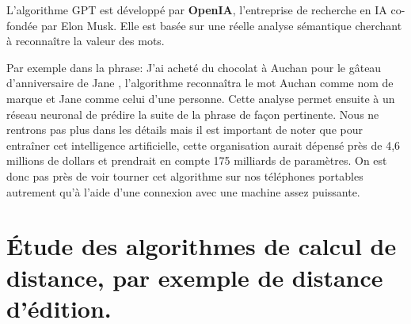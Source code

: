 \documentclass[final, 10pt]{report}
\begin{document}
        L'algorithme GPT est développé par \textbf{OpenIA}, l’entreprise de recherche en IA co-fondée par Elon Musk\cite{noauthor_quest_2021}.
        Elle est basée sur une réelle analyse sémantique cherchant à reconnaître la valeur des mots.
        
        Par exemple dans la phrase: \og J'ai acheté du chocolat à Auchan pour le gâteau d'anniversaire de Jane \fg{}, l'algorithme reconnaîtra le mot \og Auchan \fg{} comme nom de marque et \og Jane \fg{} comme celui d'une personne.
        Cette analyse permet ensuite à un réseau neuronal de prédire la suite de la phrase de façon pertinente.
        Nous ne rentrons pas plus dans les détails mais il est important de noter que pour entraîner cet intelligence artificielle, cette organisation aurait dépensé près de 4,6 millions de dollars\cite{noauthor_quest_2021} et prendrait en compte 175 milliards de paramètres\cite{noauthor_quest_2021}.
        On est donc pas près de voir tourner cet algorithme sur nos téléphones portables autrement qu'à l'aide d'une connexion avec une machine assez puissante.

\chapter{Étude des algorithmes de calcul de distance, par exemple de distance d’édition.}
\end{document}
